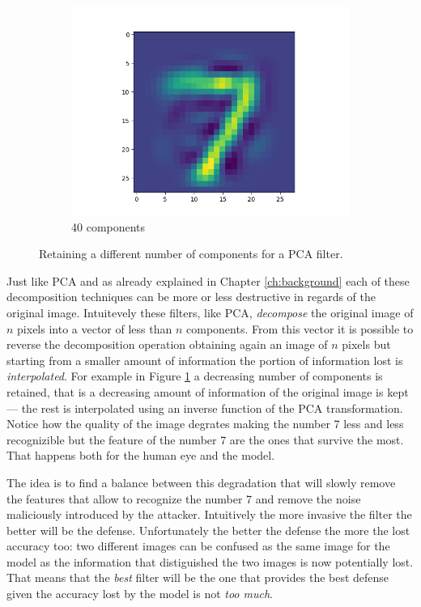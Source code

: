 \begin{figure}
\begin{subfigure}{0.3\linewidth}
    \includegraphics[width=\linewidth]{filtered-input-pca-40-components.png}
    \caption{40 components}
  \end{subfigure}
  \caption{Retaining a different number of components for a PCA filter.}
  \label{fig:various-pca-reductions}
\end{figure}

Just like PCA and as already explained in Chapter \ref{ch:background}
each of these decomposition techniques can be more or less destructive
in regards of the original image. Intuitevely these filters, like PCA,
\emph{decompose} the original image of $n$ pixels into a vector of less
than $n$ components. From this vector it is possible to reverse the
decomposition operation obtaining again an image of $n$ pixels but
starting from a smaller amount of information the portion of
information lost is \emph{interpolated}. For example in Figure
\ref{fig:various-pca-reductions} a decreasing number of components is
retained, that is a decreasing amount of information of the original
image is kept --- the rest is interpolated using an inverse function of
the PCA transformation. Notice how the quality of the image degrates
making the number 7 less and less recognizible but the feature of the
number 7 are the ones that survive the most. That happens both for the
human eye and the model.

The idea is to find a balance between this degradation that will slowly
remove the features that allow to recognize the number 7 and remove the
noise maliciously introduced by the attacker. Intuitively the more
invasive the filter the better will be the defense. Unfortunately the
better the defense the more the lost accuracy too: two different images
can be confused as the same image for the model as the information that
distiguished the two images is now potentially lost. That means that
the \emph{best} filter will be the one that provides the best defense
given the accuracy lost by the model is not \emph{too much}.

